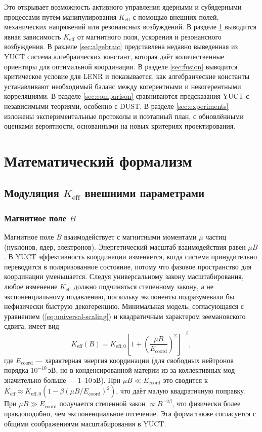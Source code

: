 \documentclass[12pt]{article}
\theoremstyle{remark}
\newcommand{\Keff}{K_{\mathrm{eff}}}
\newcommand{\Keffzero}{K_{\mathrm{eff},0}}
\begin{document}
	Это открывает возможность активного управления ядерными и субядерными процессами путём манипулирования \(\Keff\) с помощью внешних полей, механических напряжений или резонансных возбуждений. В разделе \ref{sec:math} выводится явная зависимость \(\Keff\) от магнитного поля, ускорения и резонансного возбуждения. В разделе \ref{sec:algebraic} представлена недавно выведенная из YUCT система алгебраических констант, которая даёт количественные ориентиры для оптимальной координации. В разделе \ref{sec:fusion} выводится критическое условие для LENR и показывается, как алгебраические константы устанавливают необходимый баланс между когерентными и некогерентными корреляциями. В разделе \ref{sec:comparison} сравниваются предсказания YUCT с независимыми теориями, особенно с DUST. В разделе \ref{sec:experiments} изложены экспериментальные протоколы и поэтапный план, с обновлёнными оценками вероятности, основанными на новых критериях проектирования.
	
	\section{Математический формализм}
	\label{sec:math}
	
	\subsection{Модуляция \(\Keff\) внешними параметрами}
	
	\subsubsection{Магнитное поле \(B\)}
	
	Магнитное поле \(B\) взаимодействует с магнитными моментами \(\mu\) частиц (нуклонов, ядер, электронов). Энергетический масштаб взаимодействия равен \(\mu B\). В YUCT эффективность координации изменяется, когда система принудительно переводится в поляризованное состояние, потому что фазовое пространство для координации уменьшается. Следуя универсальному закону масштабирования, любое изменение \(\Keff\) должно подчиняться степенному закону, а не экспоненциальному подавлению, поскольку экспоненты подразумевали бы нефизически быструю декогеренцию. Минимальная модель, согласующаяся с уравнением (\ref{eq:universal-scaling}) и квадратичным характером зеемановского сдвига, имеет вид
	\begin{equation}
		\Keff(B) = \Keffzero \left[ 1 + \left( \frac{\mu B}{E_{\mathrm{coord}}} \right)^2 \right]^{-\beta},
		\label{eq:keff-B}
	\end{equation}
	где \(E_{\mathrm{coord}}\) — характерная энергия координации (для свободных нейтронов порядка \(10^{-10}\,\text{эВ}\), но в конденсированной материи из-за коллективных мод значительно больше — \(1\)–\(10\,\text{эВ}\)). При \(\mu B \ll E_{\mathrm{coord}}\) это сводится к \(\Keff \approx \Keffzero (1 - \beta (\mu B/E_{\mathrm{coord}})^2)\), что даёт малую квадратичную поправку. При \(\mu B \gg E_{\mathrm{coord}}\) получается степенной закон \(\propto B^{-2\beta}\), что физически более правдоподобно, чем экспоненциальное отсечение. Эта форма также согласуется с общими соображениями масштабирования в YUCT.
	
\end{document}
